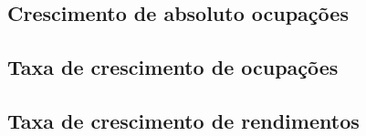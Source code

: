 \documentclass[8pt]{beamer}
\begin{document}
\begin{frame}
\textit{\hyperlink{indice_principal_amz}{}}

\end{frame}

\begin{frame}
\textit{\hyperlink{indice_principal_amz}{}}

\end{frame}

\subsection{Crescimento de absoluto ocupações}

\begin{frame}
\textit{\hyperlink{indice_principal_amz}{}}

\end{frame}

\begin{frame}
\textit{\hyperlink{indice_principal_amz}{}}

\end{frame}

\begin{frame}
\textit{\hyperlink{indice_principal_amz}{}}

\end{frame}

\subsection{Taxa de crescimento de ocupações}

\begin{frame}
\textit{\hyperlink{indice_principal_amz}{}}

\end{frame}

\begin{frame}
\textit{\hyperlink{indice_principal_amz}{}}

\end{frame}

\begin{frame}
\textit{\hyperlink{indice_principal_amz}{}}

\end{frame}

\subsection{Taxa de crescimento de rendimentos}
\end{document}

